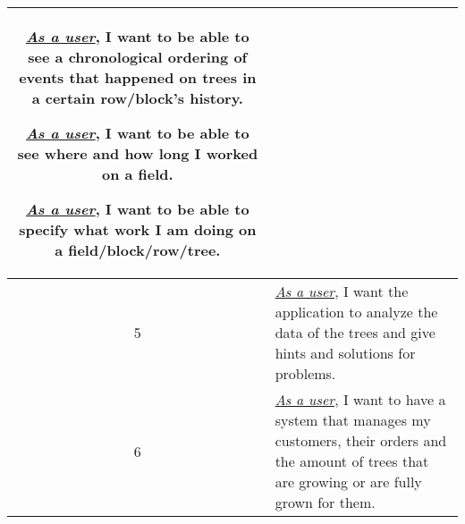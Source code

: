 \begin{tabularx}{\textwidth}{| c | X |}
	\underline{\textit{As a user}}, I want to be able to see a chronological ordering of events that happened on trees in a certain row/block's history.
	
	\underline{\textit{As a user}}, I want to be able to see where and how long I worked on a field.
	
	\underline{\textit{As a user}}, I want to be able to specify what work I am doing on a field/block/row/tree.\\
	\hline
	5 & \underline{\textit{As a user}}, I want the application to analyze the data of the trees and give hints and solutions for problems.\\
	\hline
	6 & \underline{\textit{As a user}}, I want to have a system that manages my customers, their orders and the amount of trees that are growing or are fully grown for them.\\
	\hline
\end{tabularx}